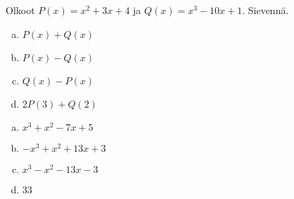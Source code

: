 \begin{tehtava}
    Olkoot $P(x)=x^2+3x+4$ ja $Q(x)=x^3-10x+1$. Sievennä.
    \begin{enumerate}[a)]
        \item $P(x)+Q(x)$
        \item $P(x)-Q(x)$
        \item $Q(x)-P(x)$
        \item $2P(3)+Q(2)$
    \end{enumerate}
    \begin{vastaus}
        \begin{enumerate}[a)]
            \item $x^3+x^2-7x+5$ %
            \item $-x^3+x^2+13x+3$ %
            \item $x^3-x^2-13x-3$ %
            \item $33$ %
        \end{enumerate}
    \end{vastaus}
\end{tehtava}

%

%

